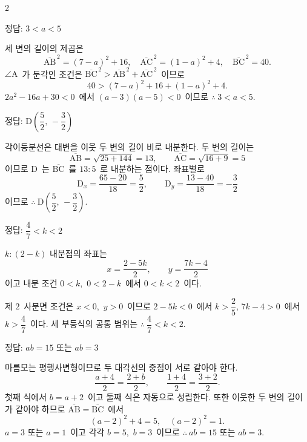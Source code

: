 \documentclass[10pt,fleqn]{article}   %
\begin{document}
\dmsoltitlefirsttrue
\begin{multicols*}{2}

\begin{dmanswerbox}
정답: $3<a<5$
\end{dmanswerbox}

세 변의 길이의 제곱은
$$\overline{\mathrm{AB}}^{\,2} = (7-a)^2 + 16,\quad \overline{\mathrm{AC}}^{\,2} = (1-a)^2 + 4,\quad \overline{\mathrm{BC}}^{\,2} = 40.$$
$\angle\mathrm{A}$\ 가 둔각인 조건은 $\overline{\mathrm{BC}}^{\,2}>\overline{\mathrm{AB}}^{\,2}+\overline{\mathrm{AC}}^{\,2}$\ 이므로
\[ 40 > (7-a)^2 + 16 + (1-a)^2 + 4. \]
$2a^2 - 16a + 30 < 0$\ 에서 $(a-3)(a-5) < 0$\ 이므로 $\therefore\ 3 < a < 5$.

\begin{dmanswerbox}
정답: $\mathrm{D}\!\left(\dfrac{5}{2},\,-\dfrac{3}{2}\right)$
\end{dmanswerbox}

각이등분선은 대변을 이웃 두 변의 길이 비로 내분한다. 두 변의 길이는
$$\overline{\mathrm{AB}} = \sqrt{25+144} = 13,\qquad \overline{\mathrm{AC}} = \sqrt{16+9} = 5$$
이므로 $\mathrm{D}$\ 는 $\overline{\mathrm{BC}}$\ 를 $13:5$\ 로 내분하는 점이다. 좌표별로
$$\mathrm{D}_x = \dfrac{65-20}{18} = \dfrac{5}{2},\qquad \mathrm{D}_y = \dfrac{13-40}{18} = -\dfrac{3}{2}$$
이므로 $\therefore\ \mathrm{D}\!\left(\dfrac{5}{2},\,-\dfrac{3}{2}\right)$.

\begin{dmanswerbox}
정답: $\dfrac{4}{7} < k < 2$
\end{dmanswerbox}

$k : (2-k)$ 내분점의 좌표는
$$x = \dfrac{2 - 5k}{2},\qquad y = \dfrac{7k - 4}{2}$$
이고 내분 조건 $0<k$,\ $0<2-k$\ 에서 $0<k<2$\ 이다.

제 $2$\ 사분면 조건은 $x<0$,\ $y>0$\ 이므로 $2-5k<0$\ 에서 $k>\dfrac{2}{5}$, $7k-4>0$\ 에서 $k>\dfrac{4}{7}$\ 이다. 세 부등식의 공통 범위는 $\therefore\ \dfrac{4}{7}<k<2$.

\begin{dmanswerbox}
정답: $ab=15$ 또는 $ab=3$
\end{dmanswerbox}

마름모는 평행사변형이므로 두 대각선의 중점이 서로 같아야 한다.
$$\dfrac{a+4}{2} = \dfrac{2+b}{2},\qquad \dfrac{1+4}{2} = \dfrac{3+2}{2}.$$
첫째 식에서 $b=a+2$\ 이고 둘째 식은 자동으로 성립한다. 또한 이웃한 두 변의 길이가 같아야 하므로 $\overline{\mathrm{AB}}=\overline{\mathrm{BC}}$\ 에서
\[ (a-2)^2 + 4 = 5,\quad (a-2)^2 = 1. \]
$a=3$ 또는 $a=1$\ 이고 각각 $b=5$,\ $b=3$\ 이므로 $\therefore\ ab=15$ 또는 $ab=3$.


\end{multicols*}
\end{document}
